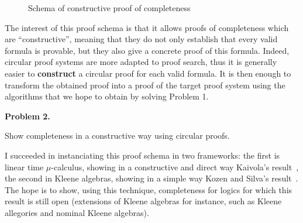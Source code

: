 \documentclass[11pt,twocolumn]{article}
\begin{document}
\begin{figure*}
  \begin{flushleft}
\end{flushleft}
\caption{Schema of constructive proof of completeness  \label{ConstructiveCompleteness}}
\end{figure*}

The interest of this proof schema is that it allows proofs of completeness which are ``constructive'', meaning that they do not only establish that every valid formula is provable, but they also give a concrete proof of this formula. Indeed, circular proof systems are more adapted to proof search, thus it is generally easier to  \textbf{construct}
a circular proof for each valid formula. It is then enough to transform the obtained proof into a proof of the target proof system using the algorithms that we hope to obtain by solving Problem 1.
  

\begin{center}
\begin{bclogo}[logo= ,arrondi = 0.1, couleur = green!10,  epBarre = 0]{}
  \vspace{-10pt}
  \textbf{Problem 2.}

Show completeness in a constructive way using circular proofs. 
\end{bclogo}
\end{center}

I succeeded in instanciating this proof schema in two  frameworks: the first is  linear time $\mu$-calculus, showing in a constructive and direct way Kaivola's result~\cite{}, the second in Kleene algebras, showing in a simple way Kozen and Silva's result~\cite{}. The hope is to show, using this technique, completeness for logics for which this result is still open (extensions of Kleene algebras for instance, such as Kleene allegories and nominal Kleene
algebras).   
  
\end{document}
